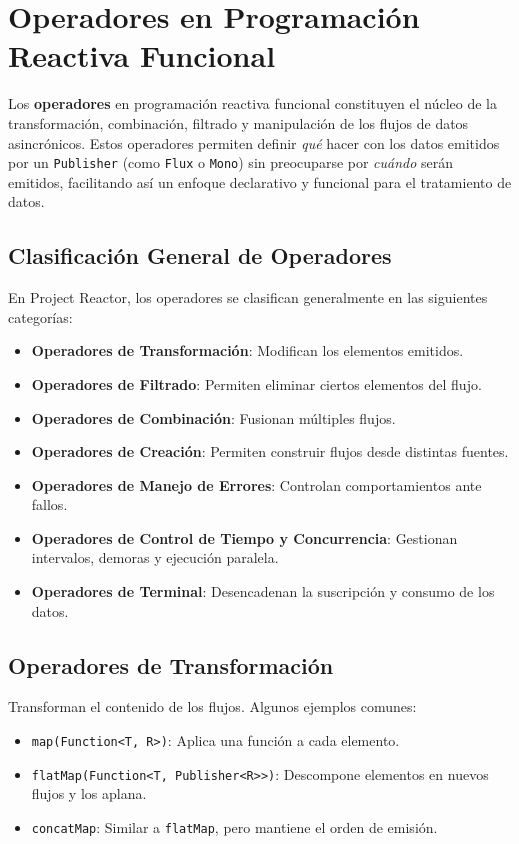 \section{Operadores en Programación Reactiva Funcional}

Los \textbf{operadores} en programación reactiva funcional constituyen el núcleo de la transformación, combinación, filtrado y manipulación de los flujos de datos asincrónicos. Estos operadores permiten definir \emph{qué} hacer con los datos emitidos por un \texttt{Publisher} (como \texttt{Flux} o \texttt{Mono}) sin preocuparse por \emph{cuándo} serán emitidos, facilitando así un enfoque declarativo y funcional para el tratamiento de datos.

\subsection{Clasificación General de Operadores}

En Project Reactor, los operadores se clasifican generalmente en las siguientes categorías:

\begin{itemize}
    \item \textbf{Operadores de Transformación}: Modifican los elementos emitidos.
    \item \textbf{Operadores de Filtrado}: Permiten eliminar ciertos elementos del flujo.
    \item \textbf{Operadores de Combinación}: Fusionan múltiples flujos.
    \item \textbf{Operadores de Creación}: Permiten construir flujos desde distintas fuentes.
    \item \textbf{Operadores de Manejo de Errores}: Controlan comportamientos ante fallos.
    \item \textbf{Operadores de Control de Tiempo y Concurrencia}: Gestionan intervalos, demoras y ejecución paralela.
    \item \textbf{Operadores de Terminal}: Desencadenan la suscripción y consumo de los datos.
\end{itemize}

\subsection{Operadores de Transformación}

Transforman el contenido de los flujos. Algunos ejemplos comunes:

\begin{itemize}
    \item \texttt{map(Function<T, R>)}: Aplica una función a cada elemento.
    \item \texttt{flatMap(Function<T, Publisher<R>>)}: Descompone elementos en nuevos flujos y los aplana.
    \item \texttt{concatMap}: Similar a \texttt{flatMap}, pero mantiene el orden de emisión.
\end{itemize}

